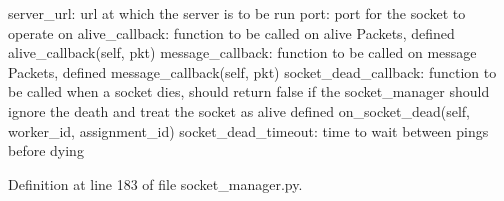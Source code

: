 \begin{DoxyVerb}server_url:           url at which the server is to be run
port:                 port for the socket to operate on
alive_callback:       function to be called on alive Packets, defined
               alive_callback(self, pkt)
message_callback:     function to be called on message Packets, defined
               message_callback(self, pkt)
socket_dead_callback: function to be called when a socket dies, should
              return false if the socket_manager should ignore
              the death and treat the socket as alive defined
               on_socket_dead(self, worker_id, assignment_id)
socket_dead_timeout:  time to wait between pings before dying
\end{DoxyVerb}
 

Definition at line 183 of file socket\+\_\+manager.\+py.


